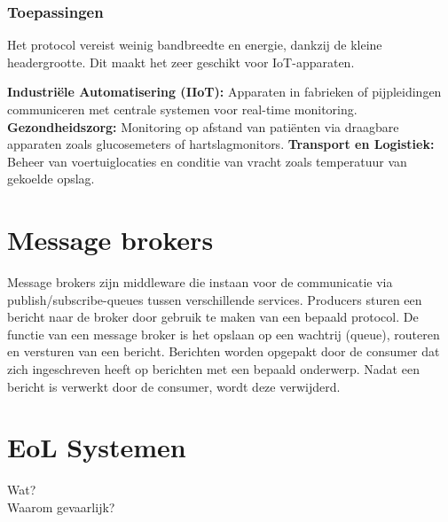 \subsubsection{Toepassingen}
Het protocol vereist weinig bandbreedte en energie, dankzij de kleine headergrootte. 
Dit maakt het zeer geschikt voor IoT-apparaten.

\textbf{Industriële Automatisering (IIoT):} Apparaten in fabrieken of pijpleidingen communiceren met centrale systemen voor real-time monitoring.
\textbf{Gezondheidszorg:} Monitoring op afstand van patiënten via draagbare apparaten zoals glucosemeters of hartslagmonitors.
\textbf{Transport en Logistiek:} Beheer van voertuiglocaties en conditie van vracht zoals temperatuur van gekoelde opslag.
 
\section{Message brokers}
Message brokers zijn middleware die instaan voor de communicatie via publish/subscribe-queues tussen verschillende services.
Producers sturen een bericht naar de broker door gebruik te maken van een bepaald protocol.
De functie van een message broker is het opslaan op een wachtrij (queue), routeren en versturen van een bericht.
Berichten worden opgepakt door de consumer dat zich ingeschreven heeft op berichten met een bepaald onderwerp.
Nadat een bericht is verwerkt door de consumer, wordt deze verwijderd.

\section{EoL Systemen}
Wat?\\
Waarom gevaarlijk?\\

 










